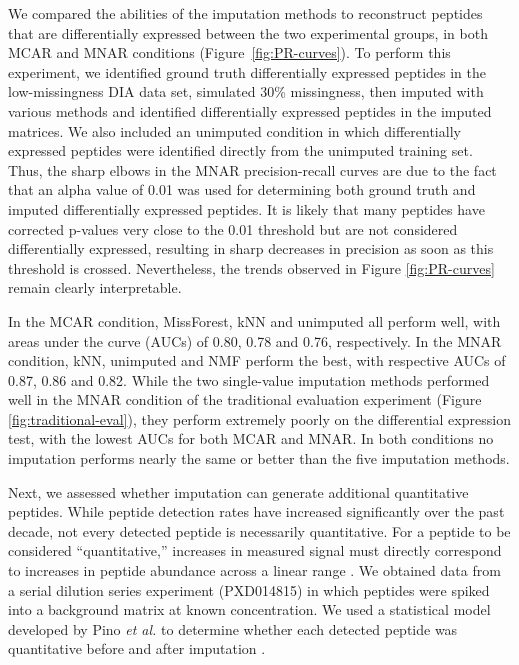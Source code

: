 \documentclass{article}
\begin{document}
We compared the abilities of the imputation methods to reconstruct peptides that are differentially expressed between the two experimental groups, in both MCAR and MNAR conditions (Figure~\ref{fig:PR-curves}). To perform this experiment, we identified ground truth differentially expressed peptides in the low-missingness DIA data set, simulated 30\% missingness, then imputed with various methods and identified differentially expressed peptides in the imputed matrices. We also included an unimputed condition in which differentially expressed peptides were identified directly from the unimputed training set. Thus, the sharp elbows in the MNAR precision-recall curves are due to the fact that an alpha value of 0.01 was used for determining both ground truth and imputed differentially expressed peptides. It is likely that many peptides have corrected p-values very close to the 0.01 threshold but are not considered differentially expressed, resulting in sharp decreases in precision as soon as this threshold is crossed. Nevertheless, the trends observed in Figure \ref{fig:PR-curves} remain clearly interpretable. 

In the MCAR condition, MissForest, kNN and unimputed all perform well, with areas under the curve (AUCs) of 0.80, 0.78 and 0.76, respectively. In the MNAR condition, kNN, unimputed and NMF perform the best, with respective AUCs of 0.87, 0.86 and 0.82. While the two single-value imputation methods performed well in the MNAR condition of the traditional evaluation experiment (Figure \ref{fig:traditional-eval}), they perform extremely poorly on the differential expression test, with the lowest AUCs for both MCAR and MNAR. In both conditions no imputation performs nearly the same or better than the five imputation methods. 

Next, we assessed whether imputation can generate additional quantitative peptides. While peptide detection rates have increased significantly over the past decade, not every detected peptide is necessarily quantitative. For a peptide to be considered ``quantitative,'' increases in measured signal must directly correspond to increases in peptide abundance across a linear range \cite{matrix-matched-calib}. We obtained data from a serial dilution series experiment (PXD014815) in which peptides were spiked into a background matrix at known concentration. We used a statistical model developed by Pino \textit{et al.} to determine whether each detected peptide was quantitative before and after imputation \cite{matrix-matched-calib}.
\end{document}
